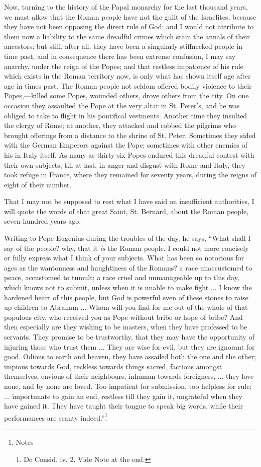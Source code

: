 Now, turning to the history of the Papal monarchy for
the last thousand years, we must allow that the Roman
people have not the guilt of the Israelites, because they
have not been opposing the direct rule of God; and I
would not attribute to them now a liability to the same
dreadful crimes which stain the annals of their
ancestors; but still, after all, they have been a
singularly stiffnecked people in time past, and in
consequence there has been extreme confusion, I may say
anarchy, under the reign of the Popes; and that restless
impatience of his rule which exists in the Roman
territory now, is only what has shown itself age after
age in times past. The Roman people not seldom offered
bodily violence to their Popes,—killed some Popes,
wounded others, drove others from the city. On one
occasion they assaulted the Pope at the very altar in St.
Peter's, and he was obliged to take to flight in his
pontifical vestments. Another time they insulted the
clergy of Rome; at another, they attacked and robbed the
pilgrims who brought offerings from a distance to the
shrine of St. Peter. Sometimes they sided with the German
Emperors against the Pope; sometimes with other enemies
of his in Italy itself. As many as thirty-six Popes
endured this dreadful contest with their own subjects,
till at last, in anger and disgust with Rome and Italy,
they took refuge in France, where they remained for
seventy years, during the reigns of eight of their
number.

That I may not be supposed to rest what I have said on
insufficient authorities, I will quote the words of that
great Saint, St. Bernard, about the Roman people, seven
hundred years ago.

Writing to Pope Eugenius during the troubles of the
day, he says, ``What shall I say of the people? why,
that it \emph{is} the Roman people. I could not more
concisely or fully express what I think of your subjects.
What has been so notorious for ages as the wantonness and
haughtiness of the Romans? a race unaccustomed to peace,
accustomed to tumult; a race cruel and unmanageable up to
this day, which knows not to submit, unless when it is
unable to make fight ... I know the hardened heart of
this people, but God is powerful even of these stones to
raise up children to Abraham ... Whom will you find for me
out of the whole of that populous city, who received you
as Pope without bribe or hope of bribe? And then
especially are they wishing to be masters, when they have
professed to be servants. They promise to be trustworthy,
that they may have the opportunity of injuring those who
trust them ... They are wise for evil, but they are
ignorant for good. Odious to earth and heaven, they have
assailed both the one and the other; impious towards God,
reckless towards things sacred, factious amongst
themselves, envious of their neighbours, inhuman towards
foreigners, ... they love none, and by none are loved.
Too impatient for submission, too helpless for rule; ...
importunate to gain an end, restless till they gain it,
ungrateful when they have gained it. They have taught
their tongue to speak big words, while their performances
are scanty indeed.''\footnote{Notes

1. De Consid. iv. 2. Vide Note at the end.}

